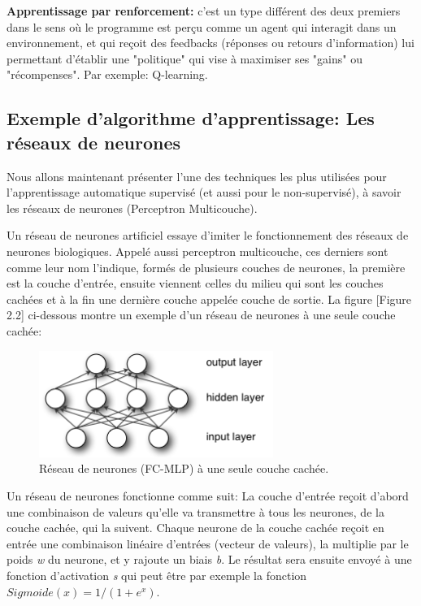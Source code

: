 \textbf{Apprentissage par renforcement:} c'est un type différent des deux premiers dans le sens où le programme est perçu comme un agent qui interagit dans un environnement, et qui reçoit des feedbacks (réponses ou retours d'information) lui permettant d’établir une "politique" qui vise à maximiser ses "gains" ou "récompenses". Par exemple: Q-learning.\\


\subsection{Exemple d'algorithme d'apprentissage: Les réseaux de neurones}
	
	Nous allons maintenant présenter l'une des techniques les plus utilisées pour l'apprentissage automatique supervisé (et aussi pour le non-supervisé), à savoir les réseaux de neurones (Perceptron Multicouche).
	
	Un réseau de neurones artificiel essaye d'imiter le fonctionnement des réseaux de neurones biologiques. Appelé aussi perceptron multicouche, ces derniers sont comme leur nom l'indique, formés de plusieurs couches de neurones, la première est la couche d'entrée, ensuite viennent celles du milieu qui sont les couches cachées et à la fin une dernière couche appelée couche de sortie. La figure [Figure 2.2] ci-dessous montre un exemple d'un réseau de neurones à une seule couche cachée:


\begin{figure}[H]
	\centering
		\includegraphics[width=3in]{Figures/mlp.png}
	\caption[An Electron]{Réseau de neurones (FC-MLP) à une seule couche cachée.}
	\label{fig:Electron}
\end{figure}

	Un réseau de neurones fonctionne comme suit: La couche d'entrée reçoit d'abord une combinaison de valeurs qu'elle va transmettre à tous les neurones, de la couche cachée, qui la suivent. Chaque neurone de la couche cachée reçoit en entrée une combinaison linéaire d'entrées (vecteur de valeurs), la multiplie par le poids \textit{w} du neurone, et y rajoute un biais \textit{b}. Le résultat sera ensuite envoyé à une fonction d'activation \textit{s} qui peut être par exemple la fonction $Sigmoide(x) = 1/(1+e^{x})$.
	
